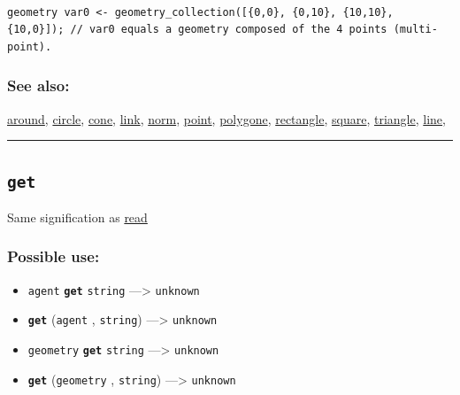 \documentclass[]{book}
\providecommand{\tightlist}{%
  \setlength{\itemsep}{0pt}\setlength{\parskip}{0pt}}
\theoremstyle{definition}
\theoremstyle{definition}
\theoremstyle{definition}
\theoremstyle{remark}
\begin{document}
\begin{verbatim}
 
geometry var0 <- geometry_collection([{0,0}, {0,10}, {10,10}, {10,0}]); // var0 equals a geometry composed of the 4 points (multi-point).
\end{verbatim}

\subsubsection{See also:}\label{see-also-107}

\href{operators-a-to-a.html\#around}{around},
\href{operators-b-to-c.html\#circle}{circle},
\href{operators-b-to-c.html\#cone}{cone},
\href{operators-i-to-m.html\#link}{link},
\href{operators-n-to-r.html\#norm}{norm},
\href{operators-n-to-r.html\#point}{point},
\href{operators-s-to-z.html\#polygone}{polygone},
\href{operators-n-to-r.html\#rectangle}{rectangle},
\href{operators-s-to-z.html\#square}{square},
\href{operators-s-to-z.html\#triangle}{triangle},
\href{operators-i-to-m.html\#line}{line},

\begin{center}\rule{0.5\linewidth}{\linethickness}\end{center}

\subsection{\texorpdfstring{\texttt{get}}{get}}\label{get}

Same signification as \href{operators-n-to-r.html\#read}{read}

\subsubsection{Possible use:}\label{possible-use-193}

\begin{itemize}
\tightlist
\item
  \texttt{agent} \textbf{\texttt{get}} \texttt{string} ---\textgreater{}
  \texttt{unknown}
\item
  \textbf{\texttt{get}} (\texttt{agent} , \texttt{string})
  ---\textgreater{} \texttt{unknown}
\item
  \texttt{geometry} \textbf{\texttt{get}} \texttt{string}
  ---\textgreater{} \texttt{unknown}
\item
  \textbf{\texttt{get}} (\texttt{geometry} , \texttt{string})
  ---\textgreater{} \texttt{unknown}
\end{itemize}
\end{document}
